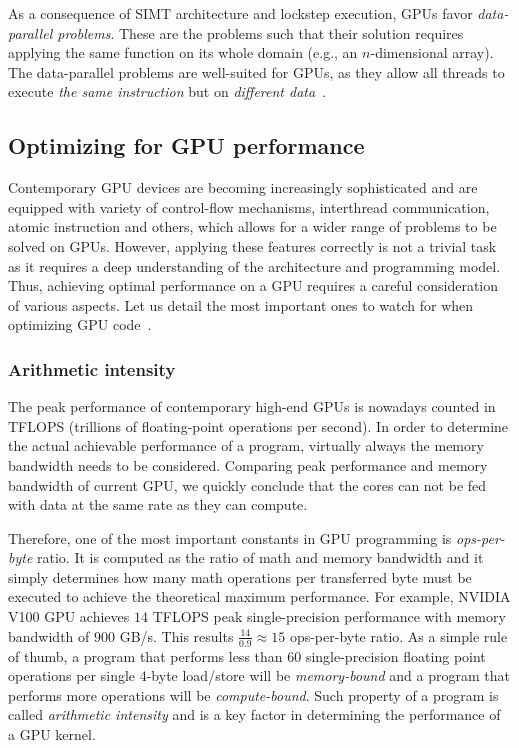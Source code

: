 As a consequence of SIMT architecture and lockstep execution, GPUs favor \emph{data-parallel problems}. These are the problems such that their solution requires applying the same function on its whole domain (e.g., an $n$-dimensional array). The data-parallel problems are well-suited for GPUs, as they allow all threads to execute \emph{the same instruction} but on \emph{different data}~\cite{navarro2014survey}.

\subsection{Optimizing for GPU performance}
\label{sec:gpu_optim}

Contemporary GPU devices are becoming increasingly sophisticated and are equipped with variety of control-flow mechanisms, interthread communication, atomic instruction and others, which allows for a wider range of problems to be solved on GPUs. However, applying these features correctly is not a trivial task as it requires a deep understanding of the architecture and programming model. Thus, achieving optimal performance on a GPU requires a careful consideration of various aspects. Let us detail the most important ones to watch for when optimizing GPU code~\cite{pratx2011gpu}.

\subsubsection{Arithmetic intensity}
\label{sec:arithmetic_int}

The peak performance of contemporary high-end GPUs is nowadays counted in TFLOPS (trillions of floating-point operations per second). In order to determine the actual achievable performance of a program, virtually always the memory bandwidth needs to be considered. Comparing peak performance and memory bandwidth of current GPU, we quickly conclude that the cores can not be fed with data at the same rate as they can compute.

Therefore, one of the most important constants in GPU programming is \emph{ops-per-byte} ratio. It is computed as the ratio of math and memory bandwidth and it simply determines how many math operations per transferred byte must be executed to achieve the theoretical maximum performance. For example, NVIDIA V100 GPU achieves $14$ TFLOPS peak single-precision performance with memory bandwidth of $900$ GB/s. This results $\frac{14}{0.9} \approx 15$ ops-per-byte ratio. As a simple rule of thumb, a program that performs less than $60$ single-precision floating point operations per single $4$-byte load/store will be \emph{memory-bound} and a program that performs more operations will be \emph{compute-bound}. Such property of a program is called \emph{arithmetic intensity} and is a key factor in determining the performance of a GPU kernel.

